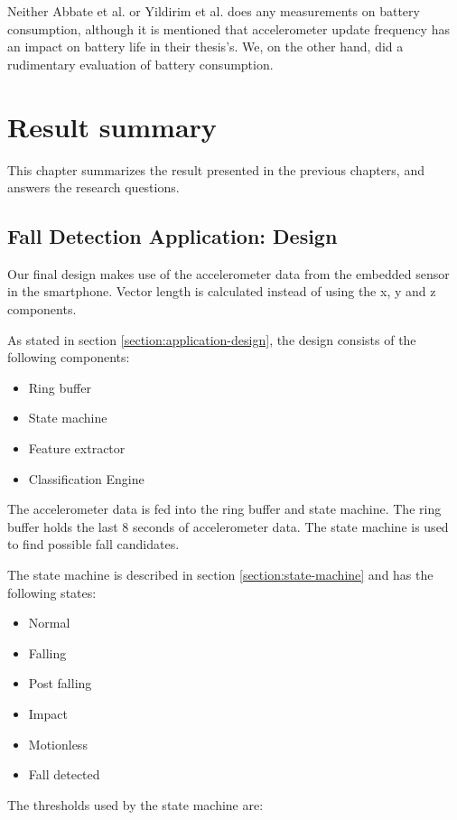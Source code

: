\documentclass[12pt, a4paper, onecolumn]{article}
\begin{document}
	Neither Abbate et al. or Yildirim et al. does any measurements on battery consumption, although it is mentioned that accelerometer update frequency has an impact on battery life in their thesis's. We, on the other hand, did a rudimentary evaluation of battery consumption.
		\newpage
	\section{Result summary} \label{section:result-summary}
	
	This chapter summarizes the result presented in the previous chapters, and answers the research questions.
	
	\subsection{Fall Detection Application: Design}
	
	Our final design makes use of the accelerometer data from the embedded sensor in the smartphone. Vector length is calculated instead of using the x, y and z components.
	
	As stated in section \ref{section:application-design}, the design consists of the following components:
	
	\begin{itemize}
		\item Ring buffer
		\item State machine
		\item Feature extractor
		\item Classification Engine
	\end{itemize}
	
	The accelerometer data is fed into the ring buffer and state machine. The ring buffer holds the last 8 seconds of accelerometer data. The state machine is used to find possible fall candidates.
	
	The state machine is described in section \ref{section:state-machine} and has the following states:
	
	\begin{itemize}
		\item Normal
		\item Falling
		\item Post falling
		\item Impact
		\item Motionless
		\item Fall detected
	\end{itemize}
	
	The thresholds used by the state machine are:
	
\end{document}
